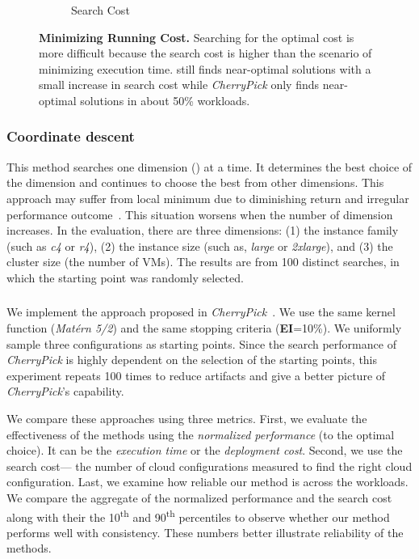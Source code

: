 \begin{figure}[!htbp]
\begin{subfigure}[b]{0.4\textwidth}
    \caption{Search Cost}
    \label{fig:single_cost_overall_steps}
\end{subfigure}
\caption{\small{\textbf{Minimizing Running Cost.}
 Searching for the optimal cost is more difficult because the search cost is higher than the scenario of minimizing execution time. \scout still finds near-optimal solutions with a small increase in search cost while \emph{CherryPick} only finds near-optimal solutions in about 50\% workloads.}}
\label{fig:single_cost_overall}
\end{figure}


\subsubsection*{Coordinate descent}
This method searches
one dimension () at a time.
It determines the best choice of the dimension and
continues to choose the best from other dimensions.
This approach may suffer from local minimum due to
diminishing return and irregular performance outcome~\cite{Alipourfard2017}.
This situation worsens when the number of dimension increases.
In the evaluation, there are three dimensions:
(1) the instance family (such as \emph{c4} or \emph{r4}), (2)
the instance size (such as, \emph{large} or \emph{2xlarge}), and (3) the cluster size (the number of VMs).
The results are from 100 distinct searches, in which the starting point was randomly selected.


\subsubsection*{\cherrypick}
We implement the approach
proposed in \emph{CherryPick}~\cite{Alipourfard2017}.
We use
the same kernel function (\emph{Mat\'ern 5/2}) and
the same stopping criteria (\textbf{EI}=10\%).
We uniformly sample three configurations as starting points.
Since the search performance of \emph{CherryPick} is highly dependent on the selection of the starting points,
this experiment repeats 100 times to reduce artifacts
and give a better picture of \emph{CherryPick}'s capability.

We compare these approaches using three metrics.
First, we evaluate the effectiveness of the methods using
the \textit{normalized performance} (to the optimal choice).
It can be the \textit{execution time} or the \emph{deployment cost}.
Second, we use the search cost--- the number of cloud configurations measured to find the right cloud configuration.
Last, we examine how reliable our method is across the workloads. %
We compare the aggregate of the normalized performance and the search cost along with their the 10\textsuperscript{th} and 90\textsuperscript{th} percentiles to observe whether our method performs well with consistency.  These numbers better illustrate reliability of the methods.


